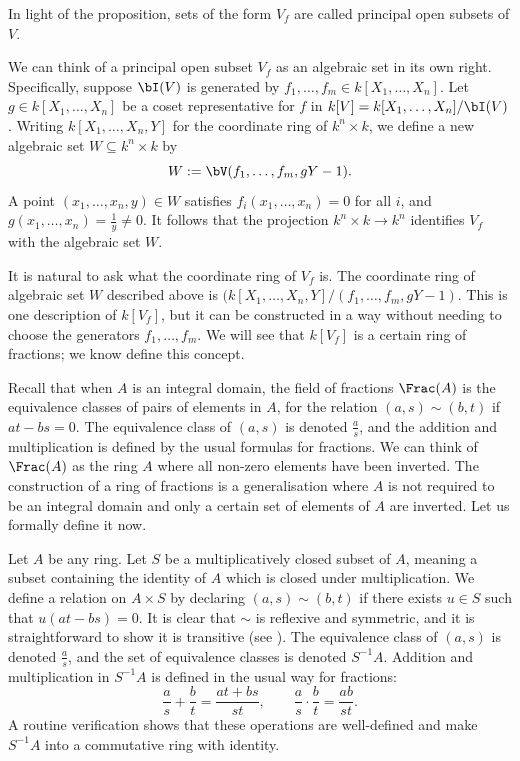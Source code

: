\documentclass[12pt]{amsart}
\theoremstyle{plain}
\begin{document}
In light of the proposition, sets of the form $V_f$ are called principal open subsets of $V$.

We can think of a principal open subset $V_f$ as an algebraic set in its own right.
Specifically, suppose $\bI(V)$ is generated by $f_1, \ldots, f_m \in k[X_1, \ldots, X_n]$.
Let $g \in k[X_1, \ldots, X_n]$ be a coset representative for $f$ in $k[V] = k[X_1, \ldots, X_n]/\bI(V)$.
Writing $k[X_1, \ldots, X_n, Y]$ for the coordinate ring of $k^n \times k$, we define a new algebraic set $W \subseteq k^n \times k$ by 
$$W:=\bV(f_1, \ldots, f_m, g Y - 1).$$
A point $(x_1, \ldots, x_n, y) \in W$ satisfies $f_i(x_1, \ldots, x_n) = 0$ for all $i$, and  $g(x_1, \ldots, x_n) = \frac{1}{y} \ne 0$.
It follows that the projection $k^n \times k \to k^n$ identifies $V_f$ with the algebraic set $W$.

It is natural to ask what the coordinate ring of $V_f$ is.
The coordinate ring of algebraic set $W$ described above is $(k[X_1,\ldots, X_n,Y]/(f_1, \ldots, f_m, gY-1).$
This is one description  of $k[V_f]$, but it can be constructed in a way without needing to choose the generators $f_1, \ldots, f_m$.
We will see that $k[V_f]$ is a certain ring of fractions; we know define this concept.

Recall that when $A$ is an integral domain, the field of fractions $\Frac(A)$ is the equivalence classes of pairs of elements in $A$, for the relation $(a, s) \sim (b, t)$ if $at-bs=0$.
The equivalence class of $(a,s)$ is denoted $\frac{a}{s}$, and the addition and multiplication is defined by the usual formulas for fractions.
We can think of $\Frac(A)$ as the ring $A$ where all non-zero elements have been inverted.
The construction of a ring of fractions is a generalisation where $A$ is not required to be an integral domain and only a certain set of elements of $A$ are inverted.
Let us formally define it now.

Let $A$ be any ring.
Let $S$ be a multiplicatively closed subset of $A$, meaning a subset containing the identity of $A$ which is closed under multiplication.
We define a relation on $A \times S$ by declaring $(a, s) \sim (b, t)$ if there exists $u \in S$ such that $u(at - bs)=0$.
It is clear that $\sim$ is reflexive and symmetric, and it is straightforward to show it is transitive (see \cite[\S 3]{AM}).
The equivalence class of $(a,s)$ is denoted $\frac{a}{s}$, and the set of equivalence classes is denoted $S^{-1}A$.
Addition and multiplication in $S^{-1}A$ is defined in the usual way for fractions:
$$\frac{a}{s}+\frac{b}{t} = \frac{at+bs}{st}, \qquad \frac{a}{s}\cdot\frac{b}{t} = \frac{ab}{st}.$$
A routine verification shows that these operations are well-defined and make $S^{-1}A$ into a commutative ring with identity.
\end{document}
